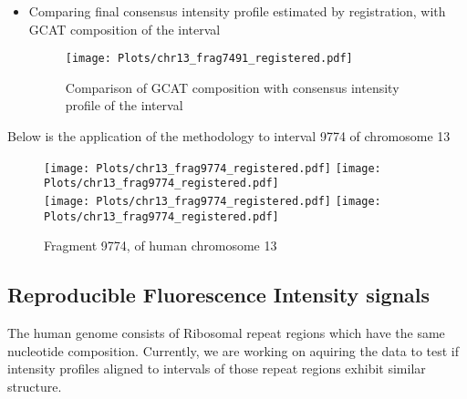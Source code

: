 \begin{itemize}
\item Comparing final consensus intensity profile estimated by registration, with GCAT composition of the interval
\begin{figure}[H]
\begin{center}
\texttt{[image: Plots/chr13\_frag7491\_registered.pdf]}
\end{center}
\caption{Comparison of GCAT composition with consensus intensity profile of the interval}
\label{fig:Frag7491_Compare}
\end{figure}
\end{itemize}

\newpage
Below is the application of the methodology to interval 9774 of chromosome 13
\begin{figure}[H]
\begin{center}
\texttt{[image: Plots/chr13\_frag9774\_registered.pdf]}
\texttt{[image: Plots/chr13\_frag9774\_registered.pdf]} \\
\texttt{[image: Plots/chr13\_frag9774\_registered.pdf]} 
\texttt{[image: Plots/chr13\_frag9774\_registered.pdf]}
\end{center}
\caption{Fragment 9774, of human chromosome 13}
\label{fig:Frag9774_All}
\end{figure}

\subsection{Reproducible Fluorescence Intensity signals}
\begin{tcolorbox}[colback=green!5,colframe=green!40!black,title=Work in progress] %
The human genome consists of Ribosomal repeat regions which have the same nucleotide composition. Currently, we are working on aquiring the data to test if intensity profiles aligned to intervals of those repeat regions exhibit similar structure.
\end{tcolorbox}





